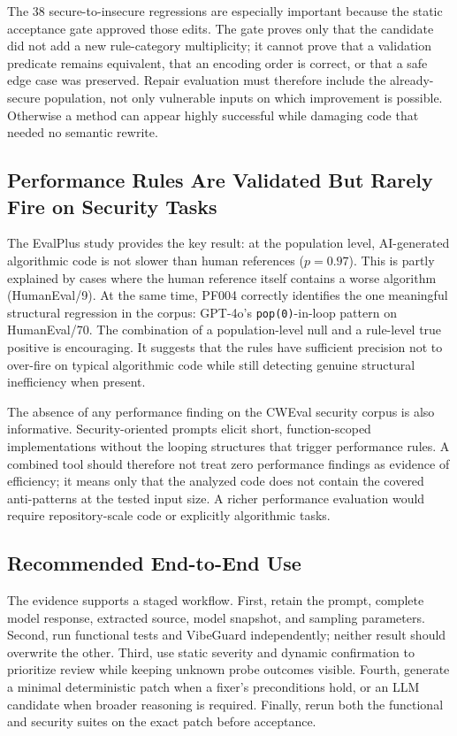 \documentclass[sigconf,nonacm]{acmart}
\begin{document}
The 38 secure-to-insecure regressions are especially important because the
static acceptance gate approved those edits. The gate proves only that the
candidate did not add a new rule-category multiplicity; it cannot prove that a
validation predicate remains equivalent, that an encoding order is correct, or
that a safe edge case was preserved. Repair evaluation must therefore include
the already-secure population, not only vulnerable inputs on which improvement
is possible. Otherwise a method can appear highly successful while damaging
code that needed no semantic rewrite.

\subsection{Performance Rules Are Validated But Rarely Fire on Security Tasks}

The EvalPlus study provides the key result: at the population
level, AI-generated algorithmic code is not slower than human references
($p=0.97$). This is partly explained by cases where the human reference itself
contains a worse algorithm (HumanEval/9). At the same time, PF004 correctly
identifies the one meaningful structural regression in the corpus: GPT-4o's
\texttt{pop(0)}-in-loop pattern on HumanEval/70. The combination of a
population-level null and a rule-level true positive is encouraging. It
suggests that the rules have sufficient precision not to over-fire on typical
algorithmic code while still detecting genuine structural inefficiency when
present.

The absence of any performance finding on the CWEval security corpus is also
informative. Security-oriented prompts elicit short, function-scoped
implementations without the looping structures that trigger performance rules.
A combined tool should therefore not treat zero performance findings as
evidence of efficiency; it means only that the analyzed code does not contain
the covered anti-patterns at the tested input size. A richer performance
evaluation would require repository-scale code or explicitly algorithmic tasks.

\subsection{Recommended End-to-End Use}

The evidence supports a staged workflow. First, retain the prompt, complete
model response, extracted source, model snapshot, and sampling parameters.
Second, run functional tests and VibeGuard independently; neither result should
overwrite the other. Third, use static severity and dynamic confirmation to
prioritize review while keeping unknown probe outcomes visible. Fourth,
generate a minimal deterministic patch when a fixer's preconditions hold, or an
LLM candidate when broader reasoning is required. Finally, rerun both the
functional and security suites on the exact patch before acceptance.
\end{document}
